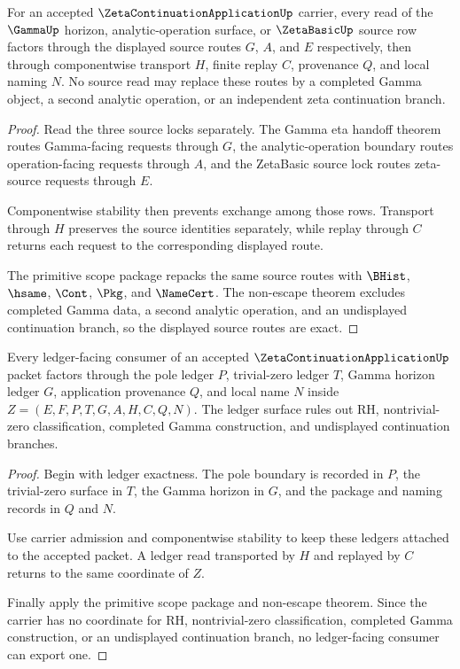 \begin{theorem}
\label{thm:zeta-continuation-application-source-route-exactness}
For an accepted $\ZetaContinuationApplicationUp$ carrier, every read of the $\GammaUp$ horizon, analytic-operation surface, or $\ZetaBasicUp$ source row factors through the displayed source routes $G$, $A$, and $E$ respectively, then through componentwise transport $H$, finite replay $C$, provenance $Q$, and local naming $N$. No source read may replace these routes by a completed Gamma object, a second analytic operation, or an independent zeta continuation branch.
\end{theorem}
\begin{proof}
Read the three source locks separately. The Gamma eta handoff theorem routes Gamma-facing requests through $G$, the analytic-operation boundary routes operation-facing requests through $A$, and the ZetaBasic source lock routes zeta-source requests through $E$.

Componentwise stability then prevents exchange among those rows. Transport through $H$ preserves the source identities separately, while replay through $C$ returns each request to the corresponding displayed route.

The primitive scope package repacks the same source routes with $\BHist$, $\hsame$, $\Cont$, $\Pkg$, and $\NameCert$. The non-escape theorem excludes completed Gamma data, a second analytic operation, and an undisplayed continuation branch, so the displayed source routes are exact.
\end{proof}

\begin{theorem}
\label{thm:zeta-continuation-application-ledger-nonescape}
Every ledger-facing consumer of an accepted $\ZetaContinuationApplicationUp$ packet factors through the pole ledger $P$, trivial-zero ledger $T$, Gamma horizon ledger $G$, application provenance $Q$, and local name $N$ inside $Z=(E,F,P,T,G,A,H,C,Q,N)$. The ledger surface rules out RH, nontrivial-zero classification, completed Gamma construction, and undisplayed continuation branches.
\end{theorem}
\begin{proof}
Begin with ledger exactness. The pole boundary is recorded in $P$, the trivial-zero surface in $T$, the Gamma horizon in $G$, and the package and naming records in $Q$ and $N$.

Use carrier admission and componentwise stability to keep these ledgers attached to the accepted packet. A ledger read transported by $H$ and replayed by $C$ returns to the same coordinate of $Z$.

Finally apply the primitive scope package and non-escape theorem. Since the carrier has no coordinate for RH, nontrivial-zero classification, completed Gamma construction, or an undisplayed continuation branch, no ledger-facing consumer can export one.
\end{proof}

